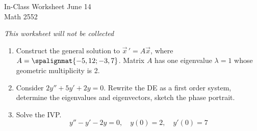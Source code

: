 \documentclass[12pt]{article}
\newcommand{\TestName}{In-Class Worksheet June 14}
\begin{document}
    
\vspace*{-.5cm}


\newcommand{\Course}{Math 2552}

\begin{center}
{\Large \TestName 
\\[4pt]
\Course}
\end{center}

\begin{center}    
{\small
\textit{This worksheet will not be collected}
}
\end{center}


\begin{enumerate}[label=(\Alph*)]
    
        \item Construct the general solution to $\vec x \, ' = A\vec x$, where $A= \spalignmat{-5,12;-3,7}$. Matrix $A$ has one eigenvalue $\lambda = 1$ whose geometric multiplicity is 2. 
        
        \item Consider $2y'' + 5y' + 2y = 0$. Rewrite the DE as a first order system, determine the eigenvalues and eigenvectors, sketch the phase portrait. 
    
        \item Solve the IVP. $$y''-y' - 2y =0, \quad y(0) = 2, \quad y'(0) = 7$$
\end{enumerate}
\end{document}
